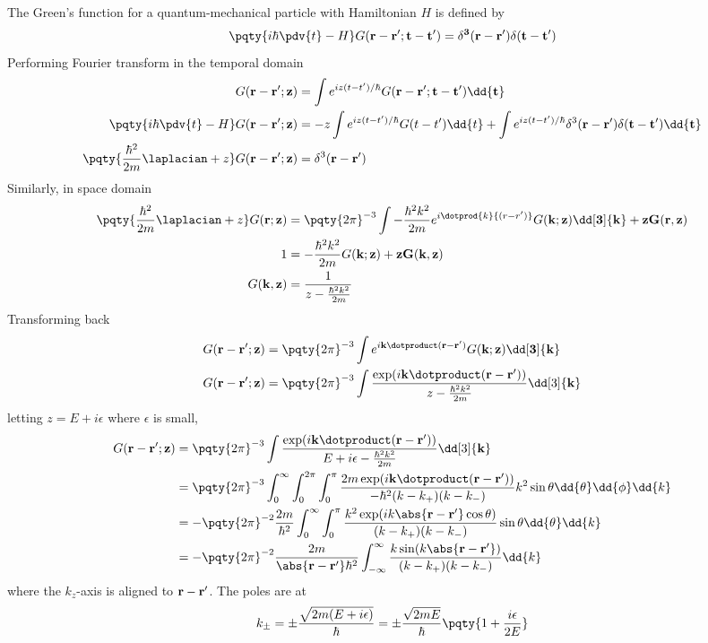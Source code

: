 \documentclass[12pt]{article}
\begin{document}
    \subsection{} The Green's function for a quantum-mechanical particle with Hamiltonian \(H\) is defined by \[
        \pqty{i\hbar \pdv{t} - H} G (\bf r - \bf r';t - t') = \delta^3(\bf r - \bf r') \delta(t - t')
    \]
    Performing Fourier transform in the temporal domain\begin{align*}
        G(\bf r - \bf r'; z) &= \int e^{iz(t - t')/{\hbar} } G(\bf r - \bf r'; t - t') \dd{t}\\
        \pqty{i\hbar \pdv{t} - H}G(\bf r - \bf r'; z) &= - z\int e^{iz(t - t')/{\hbar} } G(t - t') \dd{t} + \int e^{iz(t - t')/{\hbar} } \delta^3(\bf r - \bf r') \delta(t - t') \dd{t}\\
        \pqty{\frac{\hbar^2}{2m} \laplacian + z} G(\bf r - \bf r';z) &= \delta^3(\bf r - \bf r')
    \end{align*}
    Similarly, in space domain
    \begin{align*}
        \pqty{\frac{\hbar^2}{2m} \laplacian + z}G(\bf r;z) &= \pqty{2\pi}^{-3} \int  - \frac{\hbar^2k^2}{2m} e^{i\dotprod{k}{(r - r')}} G(\bf k ;z)\dd[3]{\bf k} + z G(\bf r,z) \\
        1 &=  - \frac{\hbar^2k^2}{2m} G(\bf k ;z) + z G(\bf k,z) \\
        G(\bf k, z) &= \frac{1}{z - \frac{\hbar^2k^2}{2m} }
    \end{align*}
    Transforming back \begin{align*}
        G(\bf r - \bf r'; z) &= \pqty{2\pi}^{- 3} \int e^{i\bf k \dotproduct (\bf{r - r'})} G(\bf k;z) \dd[3]{\bf k}\\
        G(\bf r - \bf r'; z) &= \pqty{2\pi}^{- 3} \int  \frac{\exp(i\bf k \dotproduct( \bf{r - r'}))}{z - \frac{\hbar^2k^2}{2m} } \dd[3]{\bf k}
    \end{align*}
    letting \(z = E + i\epsilon \) where \(\epsilon\) is small, \begin{align*}
        G(\bf r - \bf r'; z) &= \pqty{2\pi}^{- 3} \int  \frac{\exp(i\bf k \dotproduct( \bf{r - r'}))}{E + i\epsilon - \frac{\hbar^2k^2}{2m} } \dd[3]{\bf k} \\
        &= \pqty{2\pi}^{- 3} \int_0^{\infty} \int_0^{2\pi} \int_0^\pi  \frac{2m\exp(i\bf k \dotproduct( \bf{r - r'}))}{ - \hbar^2 (k - k_ + )(k - k_ -) } k^2  \sin\theta \dd{\theta} \dd{\phi} \dd{k}\\
        &= - \pqty{2\pi}^{- 2} \frac{2m}{\hbar^2}\int_0^{\infty} \int_0^\pi \frac{k^2\exp(ik\abs{\bf{r - r'}} \cos\theta)}{ (k - k_ + )(k - k_ -) } \sin\theta \dd{\theta}\dd{k}\\  
        &=- \pqty{2\pi}^{- 2} \frac{2m}{\abs{\bf{r - r'}}\hbar^2}\int_{ - \infty}^{\infty} \frac{k\sin(k\abs{\bf{r - r'}})}{  (k - k_ + )(k - k_ -) } \dd{k}
    \end{align*}
    where the \(k_z\)-axis is aligned to \(\bf r -\bf r'\). The poles are at \[
        k_{\pm} =\pm \frac{\sqrt{2m(E + i\epsilon)}}{\hbar} = \pm \frac{\sqrt{2mE}}{\hbar} \pqty{1 + \frac{i\epsilon}{2E} } 
    \]
\end{document}

